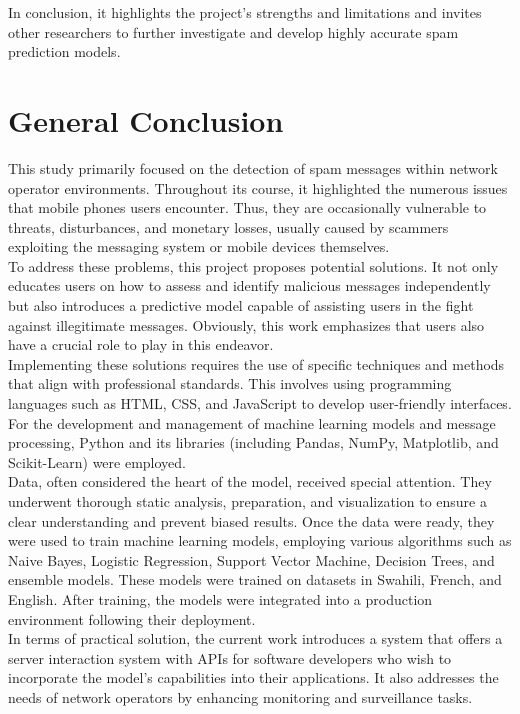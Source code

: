 \documentclass[12pt,a4paper, oneside]{book}
\begin{document}
In conclusion, it highlights the project's strengths and limitations and invites other researchers to further investigate and develop highly accurate spam prediction models.\\

\chapter*{General Conclusion} 
This study primarily focused on the detection of spam messages within network operator environments. Throughout its course, it highlighted the numerous issues that mobile phones users encounter. Thus, they are occasionally vulnerable to threats, disturbances, and monetary losses, usually caused by scammers exploiting the messaging system or mobile devices themselves.\\

To address these problems, this project proposes potential solutions. It not only educates users on how to assess and identify malicious messages independently but also introduces a predictive model capable of assisting users in the fight against illegitimate messages. Obviously, this work emphasizes that users also have a crucial role to play in this endeavor.\\

Implementing these solutions requires the use of specific techniques and methods that align with professional standards. This involves using programming languages such as HTML, CSS, and JavaScript to develop user-friendly interfaces. For the development and management of machine learning models and message processing, Python and its libraries (including Pandas, NumPy, Matplotlib, and Scikit-Learn) were employed.\\

Data, often considered the heart of the model, received special attention. They underwent thorough static analysis, preparation, and visualization to ensure a clear understanding and prevent biased results. Once the data were ready, they were used to train machine learning models, employing various algorithms such as Naive Bayes, Logistic Regression, Support Vector Machine, Decision Trees, and ensemble models. These models were trained on datasets in Swahili, French, and English. After training, the models were integrated into a production environment following their deployment.\\

In terms of practical solution, the current work introduces a system that offers a server interaction system with APIs for software developers who wish to incorporate the model's capabilities into their applications. It also addresses the needs of network operators by enhancing monitoring and surveillance tasks.\\
\end{document}
